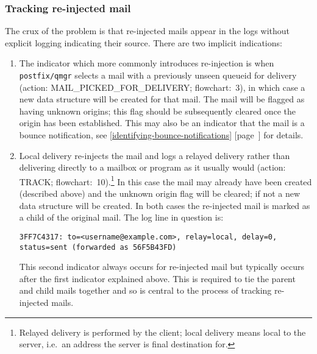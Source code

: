 \documentclass[a4paper,12pt,draft]{article}
\newcommand{\refwithpage}[1]{%
    \empty{}\ref{#1} [page~\pageref{#1}]%
}
\newcommand{\sectionref}[1]{%
    \textsection{}\refwithpage{#1}%
}
\newcommand{\daemon}[1]{%
    \texttt{postfix/#1}%
}
\begin{document}
\subsubsection{Tracking re-injected mail}

\label{tracking re-injected mail}

The crux of the problem is that re-injected mails appear in the logs
without explicit logging indicating their source.  There are two implicit
indications:

\begin{enumerate}

    \item The indicator which more commonly introduces re-injection is when
        \daemon{qmgr} selects a mail with a previously unseen queueid for
        delivery (action: MAIL\_PICKED\_FOR\_DELIVERY\@; flowchart:~3), in
        which case a new data structure will be created for that mail.  The
        mail will be flagged as having unknown origins; this flag should be
        subsequently cleared once the origin has been established.  This
        may also be an indicator that the mail is a bounce notification,
        see \sectionref{identifying-bounce-notifications} for details.

    \item Local delivery re-injects the mail and logs a relayed delivery
        rather than delivering directly to a mailbox or program as it
        usually would (action: TRACK\@; flowchart:~10).\footnote{Relayed
        delivery is performed by the \SMTP{} client; local delivery means
        local to the server, i.e.\ an address the server is final
        destination for.} In this case the mail may already have been
        created (described above) and the unknown origin flag will be
        cleared; if not a new data structure will be created.  In both
        cases the re-injected mail is marked as a child of the original
        mail.  The log line in question is:

        \texttt{3FF7C4317: to=<username@example.com>, relay=local, \newline
        delay=0, status=sent (forwarded as 56F5B43FD)}

        This second indicator always occurs for re-injected mail but
        typically occurs after the first indicator explained above.  This
        is required to tie the parent and child mails together and so is
        central to the process of tracking re-injected mails.

\end{enumerate}
\end{document}
